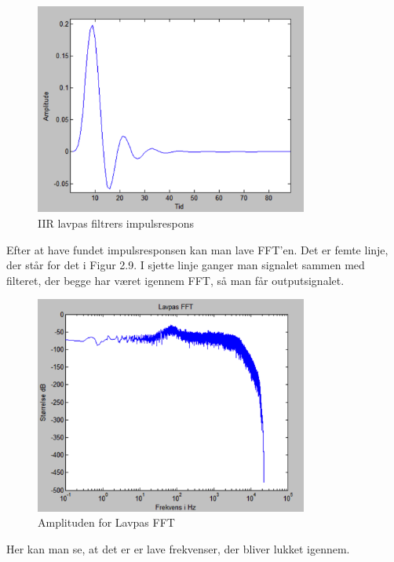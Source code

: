 \begin{figure}[H]
	\centering
	\includegraphics[width=0.8\textwidth]{Figur/Snip20151111_73}
	\caption{IIR lavpas filtrers impulsrespons}
\end{figure}

Efter at have fundet impulsresponsen kan man lave FFT'en. Det er femte linje, der står for det i Figur 2.9. 
I sjette linje ganger man signalet sammen med filteret, der begge har været igennem FFT, så man får outputsignalet. 

\begin{figure}[H]
	\centering
	\includegraphics[width=0.8\textwidth]{Figur/Snip20151111_74}
	\caption{Amplituden for Lavpas FFT}
\end{figure}

Her kan man se, at det er er lave frekvenser, der bliver lukket igennem. 

